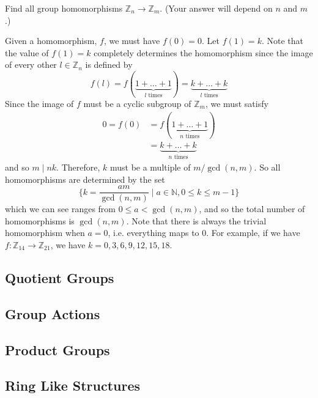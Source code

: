   \begin{exercise}[Assigned]
    Find all group homomorphisms $\mathbb{Z}_n \to \mathbb{Z}_m$. (Your answer will depend on $n$ and $m$.) 
  \end{exercise}
  \begin{solution}
    Given a homomorphism, $f$, we must have $f(0) = 0$. Let $f(1) = k$. Note that the value of $f(1) = k$ completely determines the homomorphism since the image of every other $l \in \mathbb{Z}_n$ is defined by 
    \begin{equation}
      f(l) = f(\underbrace{1 + \ldots + 1}_{l \text{ times}}) = \underbrace{k + \ldots + k}_{l \text{ times}}
    \end{equation}
    Since the image of $f$ must be a cyclic subgroup of $\mathbb{Z}_m$, we must satisfy 
    \begin{align}
      0 = f(0) & = f(\underbrace{1 + \ldots + 1}_{n \text{ times}}) \\
               & = \underbrace{k + \ldots + k}_{n \text{ times}} 
    \end{align}
    and so $m \mid nk$. Therefore, $k$ must be a multiple of $m/\gcd(n, m)$. So all homomorphisms are determined by the set 
    \begin{equation}
      \bigg\{ k = \frac{a m}{\gcd(n, m)} \; \bigg| \; a \in \mathbb{N}, 0 \leq k \leq m-1 \bigg\}
    \end{equation}
    which we can see ranges from $0 \leq a < \gcd(n, m)$, and so the total number of homomorphisms is $\gcd(n, m)$. Note that there is always the trivial homomorphism when $a = 0$, i.e. everything maps to $0$. For example, if we have $f: \mathbb{Z}_{14} \to \mathbb{Z}_{21}$, we have $k = 0, 3, 6, 9, 12, 15, 18$. 
  \end{solution}

\subsection{Quotient Groups}

\subsection{Group Actions}

\subsection{Product Groups}

\subsection{Ring Like Structures}

